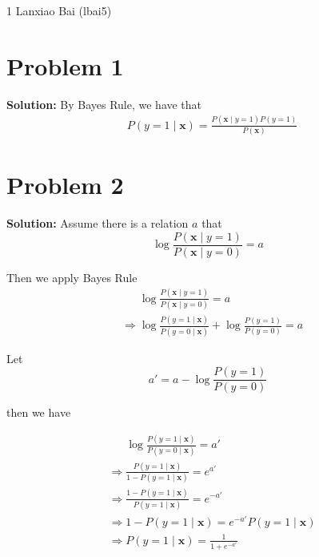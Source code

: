 \documentclass[11pt]{article}
\begin{document}
\homework
    {1}
    {Lanxiao Bai (lbai5)}
    {}

\section*{Problem 1}
\textbf{Solution:} 
	By Bayes Rule, we have that 
	\begin{align}
		& P(y = 1 \mid \textbf{x}) = \frac{P(\textbf{x} \mid y =  1)P(y = 1)}{P(\textbf{x})}\nonumber
	\end{align}
\section*{Problem 2}
\textbf{Solution:} Assume there is a relation $a$ that
	\[\log \frac{P(\textbf{x} \mid y = 1)}{P(\textbf{x} \mid y = 0)} = a\]

	Then we apply Bayes Rule
	\begin{align}
		& \phantom{\Rightarrow} \log \frac{P(\textbf{x} \mid y = 1)}{P(\textbf{x} \mid y = 0)} = a\nonumber\\
		& \Rightarrow \log \frac{P(y = 1 \mid \textbf{x})}{P(y = 0 \mid \textbf{x})} + \log \frac{P(y = 1)}{P(y = 0)} = a\nonumber
	\end{align}
	
	Let \[a' = a - \log \frac{P(y = 1)}{P(y = 0)}\]
	
	then we have 
	
	\begin{align}
		&\phantom{\Rightarrow} \log \frac{P(y = 1 \mid \textbf{x})}{P(y = 0 \mid \textbf{x})} = a'\\
		&\Rightarrow \frac{P(y = 1 \mid \textbf{x})}{1 - P(y = 1 \mid \textbf{x})} = e^{a'}\nonumber\\
		&\Rightarrow \frac{1 - P(y = 1 \mid \textbf{x})}{P(y = 1 \mid \textbf{x})} = e^{-a'}\nonumber\\
		&\Rightarrow 1 - P(y = 1 \mid \textbf{x}) = e^{-a'}P(y = 1 \mid \textbf{x})\nonumber\\
		&\Rightarrow P(y = 1 \mid \textbf{x}) = \frac{1}{1 + e^{-a'}}\nonumber
	\end{align}
\end{document}
